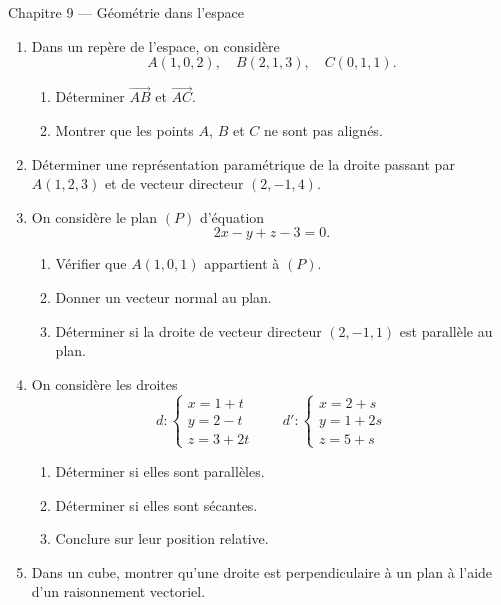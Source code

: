 \documentclass[11pt,a4paper]{article}
\begin{document}
\begin{chapitrebox}{Chapitre 9 --- Géométrie dans l'espace}
\end{chapitrebox}

\begin{enumerate}[label=\textbf{Exercice \arabic*.}, leftmargin=*, itemsep=1em]

\item Dans un repère de l'espace, on considère
\[
A(1,0,2),\quad B(2,1,3),\quad C(0,1,1).
\]

\begin{enumerate}[label=\alph*)]
    \item Déterminer \(\overrightarrow{AB}\) et \(\overrightarrow{AC}\).
    \item Montrer que les points \(A\), \(B\) et \(C\) ne sont pas alignés.
\end{enumerate}

\item Déterminer une représentation paramétrique de la droite passant par \(A(1,2,3)\) et de vecteur directeur \((2,-1,4)\).

\item On considère le plan \((P)\) d'équation
\[
2x-y+z-3=0.
\]

\begin{enumerate}[label=\alph*)]
    \item Vérifier que \(A(1,0,1)\) appartient à \((P)\).
    \item Donner un vecteur normal au plan.
    \item Déterminer si la droite de vecteur directeur \((2,-1,1)\) est parallèle au plan.
\end{enumerate}

\item On considère les droites
\[
d:\begin{cases}
x=1+t\\
y=2-t\\
z=3+2t
\end{cases}
\qquad
d':\begin{cases}
x=2+s\\
y=1+2s\\
z=5+s
\end{cases}
\]

\begin{enumerate}[label=\alph*)]
    \item Déterminer si elles sont parallèles.
    \item Déterminer si elles sont sécantes.
    \item Conclure sur leur position relative.
\end{enumerate}

\item Dans un cube, montrer qu'une droite est perpendiculaire à un plan à l'aide d'un raisonnement vectoriel.

\end{enumerate}
\end{document}
